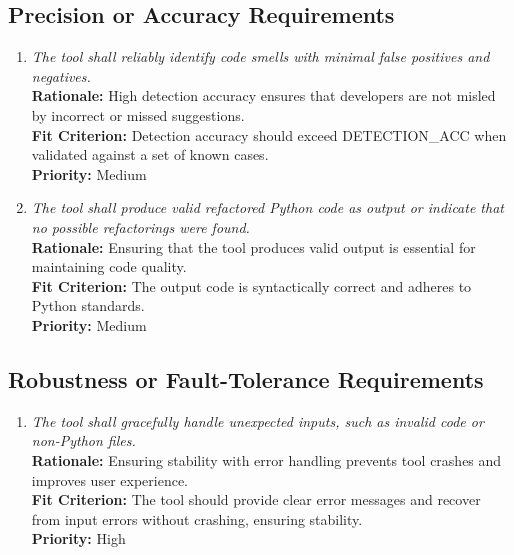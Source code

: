 \documentclass[12pt]{article}
\begin{document}
\subsection{Precision or Accuracy Requirements}
\begin{enumerate}[label=PR-PAR \arabic*., wide=0pt, leftmargin=*]
  \item \emph{The tool shall reliably identify code smells with
    minimal false positives and negatives.}\\[2mm]
    {\bf Rationale:} High detection accuracy ensures that developers
    are not misled by incorrect or missed suggestions.\\
    {\bf Fit Criterion:} Detection accuracy should exceed
    DETECTION\_ACC when validated against a set of known cases.\\
    {\bf Priority:} Medium
  \item \emph{The tool shall produce valid refactored Python code as
    output or indicate that no possible refactorings were found.}\\[2mm]
    {\bf Rationale:} Ensuring that the tool produces valid output is
    essential for maintaining code quality.\\
    {\bf Fit Criterion:} The output code is syntactically correct and
    adheres to Python standards.\\
    {\bf Priority:} Medium
\end{enumerate}

\subsection{Robustness or Fault-Tolerance Requirements}
\begin{enumerate}[label=PR-RFT \arabic*., wide=0pt, leftmargin=*]
  \item \emph{The tool shall gracefully handle unexpected inputs,
    such as invalid code or non-Python files.}\\[2mm]
    {\bf Rationale:} Ensuring stability with error handling prevents
    tool crashes and improves user experience.\\
    {\bf Fit Criterion:} The tool should provide clear error messages
    and recover from input errors without crashing, ensuring stability.\\
    {\bf Priority:} High
\end{enumerate}
\end{document}

